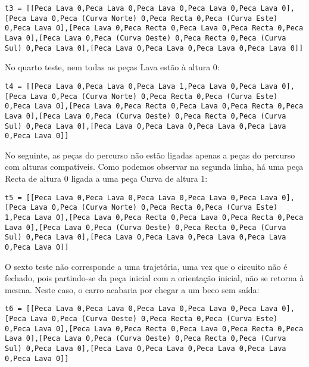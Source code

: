 \documentclass[a4paper]{report}
\begin{document}
\begin{lstlisting}
t3 = [[Peca Lava 0,Peca Lava 0,Peca Lava 0,Peca Lava 0,Peca Lava 0],[Peca Lava 0,Peca (Curva Norte) 0,Peca Recta 0,Peca (Curva Este) 0,Peca Lava 0],[Peca Lava 0,Peca Recta 0,Peca Lava 0,Peca Recta 0,Peca Lava 0],[Peca Lava 0,Peca (Curva Oeste) 0,Peca Recta 0,Peca (Curva Sul) 0,Peca Lava 0],[Peca Lava 0,Peca Lava 0,Peca Lava 0,Peca Lava 0]]
\end{lstlisting}

No quarto teste, nem todas as peças Lava estão à altura 0:

\begin{lstlisting}
t4 = [[Peca Lava 0,Peca Lava 0,Peca Lava 1,Peca Lava 0,Peca Lava 0],[Peca Lava 0,Peca (Curva Norte) 0,Peca Recta 0,Peca (Curva Este) 0,Peca Lava 0],[Peca Lava 0,Peca Recta 0,Peca Lava 0,Peca Recta 0,Peca Lava 0],[Peca Lava 0,Peca (Curva Oeste) 0,Peca Recta 0,Peca (Curva Sul) 0,Peca Lava 0],[Peca Lava 0,Peca Lava 0,Peca Lava 0,Peca Lava 0,Peca Lava 0]]
\end{lstlisting}

No seguinte, as peças do percurso não estão ligadas apenas a peças do percurso com alturas compatíveis. Como podemos observar na segunda linha, há uma peça Recta de altura 0 ligada a uma peça Curva de altura 1:

\begin{lstlisting}
t5 = [[Peca Lava 0,Peca Lava 0,Peca Lava 0,Peca Lava 0,Peca Lava 0],[Peca Lava 0,Peca (Curva Norte) 0,Peca Recta 0,Peca (Curva Este) 1,Peca Lava 0],[Peca Lava 0,Peca Recta 0,Peca Lava 0,Peca Recta 0,Peca Lava 0],[Peca Lava 0,Peca (Curva Oeste) 0,Peca Recta 0,Peca (Curva Sul) 0,Peca Lava 0],[Peca Lava 0,Peca Lava 0,Peca Lava 0,Peca Lava 0,Peca Lava 0]]
\end{lstlisting}

O sexto teste não corresponde a uma trajetória, uma vez que o circuito não é fechado, pois partindo-se da peça inicial com a orientação inicial, não se retorna à mesma. Neste caso, o carro acabaria por chegar a um beco sem saída:

\begin{lstlisting}
t6 = [[Peca Lava 0,Peca Lava 0,Peca Lava 0,Peca Lava 0,Peca Lava 0],[Peca Lava 0,Peca (Curva Oeste) 0,Peca Recta 0,Peca (Curva Este) 0,Peca Lava 0],[Peca Lava 0,Peca Recta 0,Peca Lava 0,Peca Recta 0,Peca Lava 0],[Peca Lava 0,Peca (Curva Oeste) 0,Peca Recta 0,Peca (Curva Sul) 0,Peca Lava 0],[Peca Lava 0,Peca Lava 0,Peca Lava 0,Peca Lava 0,Peca Lava 0]]
\end{lstlisting}
\end{document}
